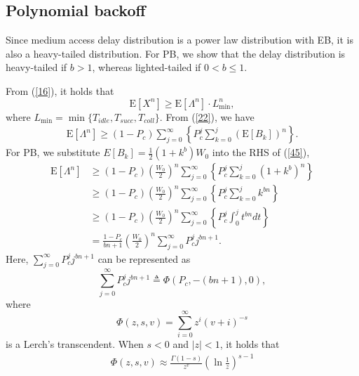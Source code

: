 \documentclass[journal]{IEEEtran}
\begin{document}
\subsection{Polynomial backoff}
Since medium access delay distribution is a power law distribution with EB, it is also a heavy-tailed distribution. For PB, we show that the delay distribution is heavy-tailed if $b>1$, whereas lighted-tailed if $0<b\leq1$.

From (\ref{16}), it holds that
\begin{equation}
\text{E}\left[X^n\right] \geq \text{E}\left[\Lambda^n\right]\cdot L_{\text{min}}^n,
\end{equation}
where $L_{\text{min}}=\min\{T_{idle},T_{succ},T_{coll}\}$. From (\ref{22}), we have
\begin{equation}
\label{45}
\begin{aligned}
\text{E}\left[\Lambda^n\right]\geq \left(1-P_c\right)\sum_{j=0}^{\infty}\left\{P_c^j \sum_{k=0}^{j}\left(\text{E}\left[B_k\right]\right)^n\right\}.
\end{aligned}
\end{equation}
For PB, we substitute $E\left[B_k\right]=\frac{1}{2}\left(1+k^b\right)W_0$ into the RHS of (\ref{45}),
\begin{equation}
\begin{aligned}
\text{E}\left[\Lambda^n\right] &\geq \left(1-P_c\right)\left(\frac{W_0}{2}\right)^n\sum_{j=0}^{\infty}\left\{P_c^j \sum_{k=0}^{j}\left(1+k^b\right)^n\right\}\\
&\geq \left(1-P_c\right)\left(\frac{W_0}{2}\right)^n\sum_{j=0}^{\infty}\left\{P_c^j \sum_{k=0}^{j}k^{bn}\right\}\\
&\geq \left(1-P_c\right)\left(\frac{W_0}{2}\right)^n\sum_{j=0}^{\infty}\left\{P_c^j \int_{0}^{j} t^{bn} dt\right\}\\
&= \frac{1-P_c}{bn+1}\left(\frac{W_0}{2}\right)^n\sum_{j=0}^{\infty}P_c^j j^{bn+1}.
\end{aligned}
\end{equation}
Here, $\sum_{j=0}^{\infty}P_c^j j^{bn+1}$ can be represented as
\begin{equation}
\label{47}
\sum_{j=0}^{\infty}P_c^j j^{bn+1} \triangleq \Phi \left(P_c, -(bn+1), 0\right),
\end{equation}
where
\begin{equation}
\Phi \left(z, s, v\right) = \sum_{i=0}^{\infty}z^{i}\left(v+i\right)^{-s}
\end{equation}
is a Lerch's transcendent. When $s<0$ and $|z|<1$, it holds that
\begin{equation}
\begin{aligned}
\Phi \left(z, s, v\right) \approx \frac{\Gamma{(1-s)}}{z^v}\left(\ln\frac{1}{z}\right)^{s-1}
\end{aligned}
\end{equation}
\end{document}

